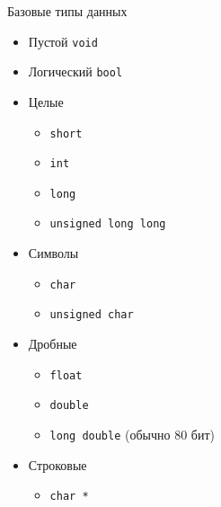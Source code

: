 \documentclass[unknownkeysallowed]{beamer}
\begin{document}
\begin{frame}[fragile]{Базовые типы данных}

\begin{itemize}
  \item Пустой
    \lstinline[basicstyle=\ttfamily\small]{void}
  \item Логический
    \lstinline[basicstyle=\ttfamily\small]{bool}
  \item Целые
    \begin{itemize}
      \item \lstinline[basicstyle=\ttfamily\small]{short}
      \item \lstinline[basicstyle=\ttfamily\small]{int}
      \item \lstinline[basicstyle=\ttfamily\small]{long}
      \item \lstinline[basicstyle=\ttfamily\small]{unsigned long long}
    \end{itemize}
  \item Символы
    \begin{itemize}
      \item \lstinline[basicstyle=\ttfamily\small]{char}
      \item \lstinline[basicstyle=\ttfamily\small]{unsigned char}
    \end{itemize}
  \item Дробные
    \begin{itemize}
      \item \lstinline[basicstyle=\ttfamily\small]{float}
      \item \lstinline[basicstyle=\ttfamily\small]{double}
      \item \lstinline[basicstyle=\ttfamily\small]{long double} (обычно 80 бит)
    \end{itemize}
  \item Строковые
    \begin{itemize}
      \item \lstinline[basicstyle=\ttfamily\small]{char *}
    \end{itemize}
\end{itemize}

\end{frame}
\end{document}
